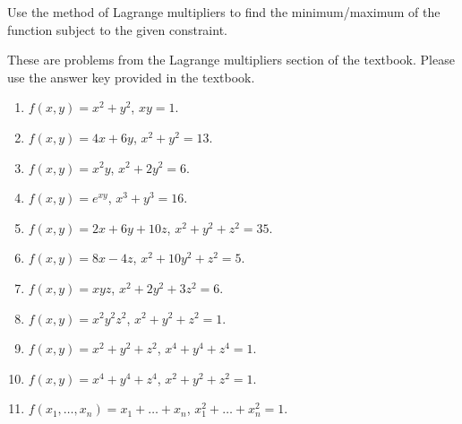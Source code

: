 Use the method of Lagrange multipliers to find the minimum/maximum of the function subject to the given constraint.

These are problems from the Lagrange multipliers section of the textbook. Please use the answer key provided in the textbook.
\begin{enumerate}
\item $f(x,y)=x^2+y^2$, $xy=1$.
\item $f(x,y)=4x+6y$, $x^2+y^2=13$.
\item $f(x,y)=x^2y$, $x^2+2y^2 =6$.
\item $f(x,y)=e^{xy}$, $x^3+y^3 =16$.
\item $f(x,y)=2x+6y+10z$, $x^2+y^2+z^2 =35$.
\item $f(x,y)=8x-4z$, $x^2+10y^2+z^2 =5$.
\item $f(x,y)=xyz$, $x^2+2y^2+3z^2 =6$.
\item $f(x,y)=x^2y^2z^2$, $ x^2+y^2+z^2=1$.
\item $f(x,y)=x^2+y^2+z^2 $, $x^4+y^4+z^4 =1$.
\item $f(x,y)=x^4+y^4+z^4$, $x^2+y^2+z^2 =1$.
\item $f(x_1,\dots, x_n) = x_1+\dots +x_n$, $x_1^2+\dots +x_n^2 =1$.
\end{enumerate}